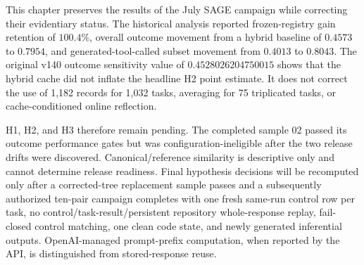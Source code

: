 This chapter preserves the results of the July SAGE campaign while correcting their evidentiary status. The historical analysis reported frozen-registry gain retention of $100.4\%$, overall outcome movement from a hybrid baseline of $0.4573$ to $0.7954$, and generated-tool-called subset movement from $0.4013$ to $0.8043$. The original v140 outcome sensitivity value of $0.4528026204750015$ shows that the hybrid cache did not inflate the headline H2 point estimate. It does not correct the use of 1,182 records for 1,032 tasks, averaging for 75 triplicated tasks, or cache-conditioned online reflection.

H1, H2, and H3 therefore remain pending. The completed sample 02 passed its outcome performance gates but was configuration-ineligible after the two release drifts were discovered. Canonical/reference similarity is descriptive only and cannot determine release readiness. Final hypothesis decisions will be recomputed only after a corrected-tree replacement sample passes and a subsequently authorized ten-pair campaign completes with one fresh same-run control row per task, no control/task-result/persistent repository whole-response replay, fail-closed control matching, one clean code state, and newly generated inferential outputs. OpenAI-managed prompt-prefix computation, when reported by the API, is distinguished from stored-response reuse.
